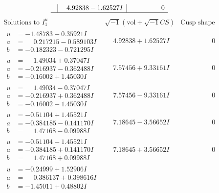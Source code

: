 \documentclass[1p]{elsarticle_modified}
\theoremstyle{definition}
\newcommand{\I}{\sqrt{-1}}
\begin{document}
$$\begin{array}{c|c|c}
 & \phantom{-}4.92838 - 1.62527 I & \phantom{-0.000000 } 0\\
 \hline 
 \end{array}$$\newpage$$\begin{array}{c|c|c}  
\text{Solutions to }I^u_{1}& \I (\text{vol} + \sqrt{-1}CS) & \text{Cusp shape}\\
 \hline 
\begin{aligned}
u &= -1.48783 - 0.35921 I \\
a &= \phantom{-}0.217215 - 0.589103 I \\
b &= -0.182323 - 0.721295 I\end{aligned}
 & \phantom{-}4.92838 + 1.62527 I & \phantom{-0.000000 } 0 \\ \hline\begin{aligned}
u &= \phantom{-}1.49034 + 0.37047 I \\
a &= -0.216937 - 0.362488 I \\
b &= -0.16002 + 1.45030 I\end{aligned}
 & \phantom{-}7.57456 + 9.33161 I & \phantom{-0.000000 } 0 \\ \hline\begin{aligned}
u &= \phantom{-}1.49034 - 0.37047 I \\
a &= -0.216937 + 0.362488 I \\
b &= -0.16002 - 1.45030 I\end{aligned}
 & \phantom{-}7.57456 - 9.33161 I & \phantom{-0.000000 } 0 \\ \hline\begin{aligned}
u &= -0.51104 + 1.45521 I \\
a &= -0.384185 - 0.141170 I \\
b &= \phantom{-}1.47168 - 0.09988 I\end{aligned}
 & \phantom{-}7.18645 - 3.56652 I & \phantom{-0.000000 } 0 \\ \hline\begin{aligned}
u &= -0.51104 - 1.45521 I \\
a &= -0.384185 + 0.141170 I \\
b &= \phantom{-}1.47168 + 0.09988 I\end{aligned}
 & \phantom{-}7.18645 + 3.56652 I & \phantom{-0.000000 } 0 \\ \hline\begin{aligned}
u &= -0.24999 + 1.52906 I \\
a &= \phantom{-}0.386137 + 0.398616 I \\
b &= -1.45011 + 0.48802 I\end{aligned}

\end{array}$$
\end{document}
